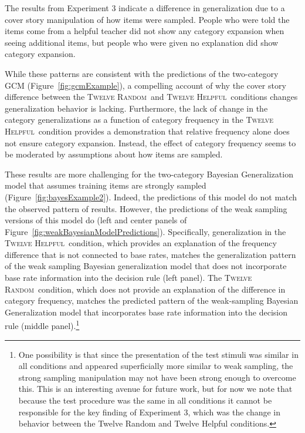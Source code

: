 \documentclass[doc,apacite]{apa6}
\newcommand{\random}{\textsc{Twelve Random}}
\newcommand{\helpful}{\textsc{Twelve Helpful}}
\begin{document}
The results from Experiment 3 indicate a difference in generalization due to a cover story manipulation of how items were sampled.
People who were told the items come from a helpful teacher did not show any category expansion when seeing additional items, but people who were given no explanation did show category expansion.


While these patterns are consistent with the predictions of the two-category GCM (Figure~\ref{fig:gcmExample}), a compelling account of why the cover story difference between the \random\ and \helpful\ conditions changes generalization behavior is lacking.
Furthermore, the lack of change in the category generalizations as a function of category frequency in the \helpful\ condition provides a demonstration that relative frequency alone does not ensure category expansion. Instead, the effect of category frequency seems to be moderated by assumptions about how items are sampled.

These results are more challenging for the two-category Bayesian Generalization model that assumes training items are strongly sampled (Figure~\ref{fig:bayesExample2}).
Indeed, the predictions of this model do not match the observed pattern of results.
However, the predictions of the weak sampling versions of this model do (left and center panels of Figure~\ref{fig:weakBayesianModelPredictions}).
Specifically, generalization in the \helpful\ condition, which provides an explanation of the frequency difference that is not connected to base rates, matches the generalization pattern of the weak sampling Bayesian generalization model that does not incorporate base rate information into the decision rule (left panel). The \random\ condition, which does not provide an
explanation of the difference in category frequency, matches the predicted pattern of the weak-sampling Bayesian Generalization model that incorporates base rate information into the decision rule (middle panel).\footnote{One possibility is that since the presentation of the test stimuli was similar in all conditions and appeared superficially more similar to weak sampling, the strong sampling manipulation may not have been strong enough to overcome this. This is an interesting avenue for future work, but for now we note that because the test procedure was the same in all conditions it cannot be responsible for the key finding of Experiment 3, which was the change in behavior between the {\sc Twelve Random} and {\sc Twelve Helpful} conditions.}
\end{document}
